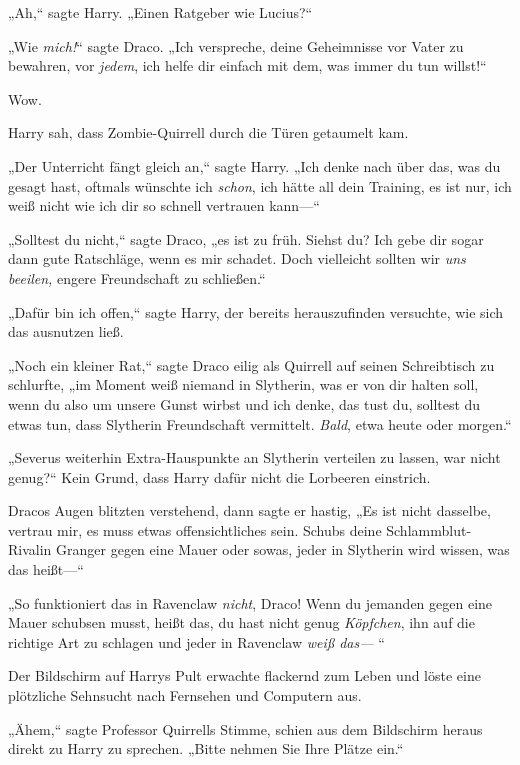 {„Ah,“ sagte Harry. „Einen Ratgeber wie Lucius?“

„Wie \emph{mich!}“ sagte Draco. „Ich verspreche, deine Geheimnisse vor Vater zu bewahren, vor \emph{jedem}, ich helfe dir einfach mit dem, was immer du tun willst!“

Wow.

Harry sah, dass Zombie-Quirrell durch die Türen getaumelt kam.

„Der Unterricht fängt gleich an,“ sagte Harry. „Ich denke nach über das, was du gesagt hast, oftmals wünschte ich \emph{schon}, ich hätte all dein Training, es ist nur, ich weiß nicht wie ich dir so schnell vertrauen kann—“

„Solltest du nicht,“ sagte Draco, „es ist zu früh. Siehst du? Ich gebe dir sogar dann gute Ratschläge, wenn es mir schadet. Doch vielleicht sollten wir \emph{uns beeilen,} engere Freundschaft zu schließen.“

„Dafür bin ich offen,“ sagte Harry, der bereits herauszufinden versuchte, wie sich das ausnutzen ließ.

„Noch ein kleiner Rat,“ sagte Draco eilig als Quirrell auf seinen Schreibtisch zu schlurfte, „im Moment weiß niemand in Slytherin, was er von dir halten soll, wenn du also um unsere Gunst wirbst und ich denke, das tust du, solltest du etwas tun, dass Slytherin Freundschaft vermittelt. \emph{Bald}, etwa heute oder morgen.“

„Severus weiterhin Extra-Hauspunkte an Slytherin verteilen zu lassen, war nicht genug?“ Kein Grund, dass Harry dafür nicht die Lorbeeren einstrich.

Dracos Augen blitzten verstehend, dann sagte er hastig, „Es ist nicht dasselbe, vertrau mir, es muss etwas offensichtliches sein. Schubs deine Schlammblut-Rivalin Granger gegen eine Mauer oder sowas, jeder in Slytherin wird wissen, was das heißt—“

„So funktioniert das in Ravenclaw \emph{nicht}, Draco! Wenn du jemanden gegen eine Mauer schubsen musst, heißt das, du hast nicht genug \emph{Köpfchen}, ihn auf die richtige Art zu schlagen und jeder in Ravenclaw \emph{weiß das—} “

Der Bildschirm auf Harrys Pult erwachte flackernd zum Leben und löste eine plötzliche Sehnsucht nach Fernsehen und Computern aus.

„Ähem,“ sagte Professor Quirrells Stimme, schien aus dem Bildschirm heraus direkt zu Harry zu sprechen. „Bitte nehmen Sie Ihre Plätze ein.“

\later

}
